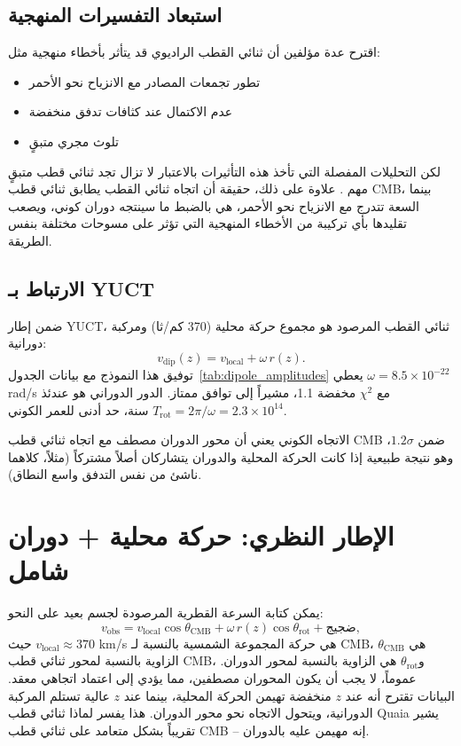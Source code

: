 \documentclass[12pt,a4paper]{article}
\begin{document}
	\subsection{استبعاد التفسيرات المنهجية}
	
	اقترح عدة مؤلفين أن ثنائي القطب الراديوي قد يتأثر بأخطاء منهجية مثل:
	\begin{itemize}
		\item تطور تجمعات المصادر مع الانزياح نحو الأحمر
		\item عدم الاكتمال عند كثافات تدفق منخفضة
		\item تلوث مجري متبقٍ
	\end{itemize}
	لكن التحليلات المفصلة التي تأخذ هذه التأثيرات بالاعتبار لا تزال تجد ثنائي قطب متبقٍ مهم \cite{Oayda2024, Singal2024, Wagenveld2025}. علاوة على ذلك، حقيقة أن اتجاه ثنائي القطب يطابق ثنائي قطب CMB، بينما السعة تتدرج مع الانزياح نحو الأحمر، هي بالضبط ما سينتجه دوران كوني، ويصعب تقليدها بأي تركيبة من الأخطاء المنهجية التي تؤثر على مسوحات مختلفة بنفس الطريقة.
	
	\subsection{الارتباط بـ YUCT}
	
	ضمن إطار YUCT، ثنائي القطب المرصود هو مجموع حركة محلية (370 كم/ثا) ومركبة دورانية:
	\[
	v_{\mathrm{dip}}(z) = v_{\mathrm{local}} + \omega \, r(z).
	\]
	توفيق هذا النموذج مع بيانات الجدول~\ref{tab:dipole_amplitudes} يعطي \(\omega = 8.5\times10^{-22}\) rad/s مع \(\chi^2\) مخفضة 1.1، مشيراً إلى توافق ممتاز. الدور الدوراني هو عندئذ \(T_{\mathrm{rot}} = 2\pi/\omega = 2.3\times10^{14}\) سنة، حد أدنى للعمر الكوني.
	
	الاتجاه الكوني يعني أن محور الدوران مصطف مع اتجاه ثنائي قطب CMB ضمن \(1.2\sigma\)، وهو نتيجة طبيعية إذا كانت الحركة المحلية والدوران يتشاركان أصلاً مشتركاً (مثلاً، كلاهما ناشئ من نفس التدفق واسع النطاق).
	
	\section{الإطار النظري: حركة محلية + دوران شامل}
	
	يمكن كتابة السرعة القطرية المرصودة لجسم بعيد على النحو:
	\begin{equation}
		v_{\text{obs}} = v_{\text{local}} \cos\theta_{\text{CMB}} + \omega \, r(z) \cos\theta_{\text{rot}} + \text{ضجيج},
	\end{equation}
	حيث \(v_{\text{local}} \approx 370\) km/s هي حركة المجموعة الشمسية بالنسبة لـ CMB، \(\theta_{\text{CMB}}\) هي الزاوية بالنسبة لمحور ثنائي قطب CMB، و\(\theta_{\text{rot}}\) هي الزاوية بالنسبة لمحور الدوران. عموماً، لا يجب أن يكون المحوران مصطفين، مما يؤدي إلى اعتماد اتجاهي معقد. البيانات تقترح أنه عند \(z\) منخفضة تهيمن الحركة المحلية، بينما عند \(z\) عالية تستلم المركبة الدورانية، ويتحول الاتجاه نحو محور الدوران. هذا يفسر لماذا ثنائي قطب Quaia يشير تقريباً بشكل متعامد على ثنائي قطب CMB – إنه مهيمن عليه بالدوران.
	
\end{document}
